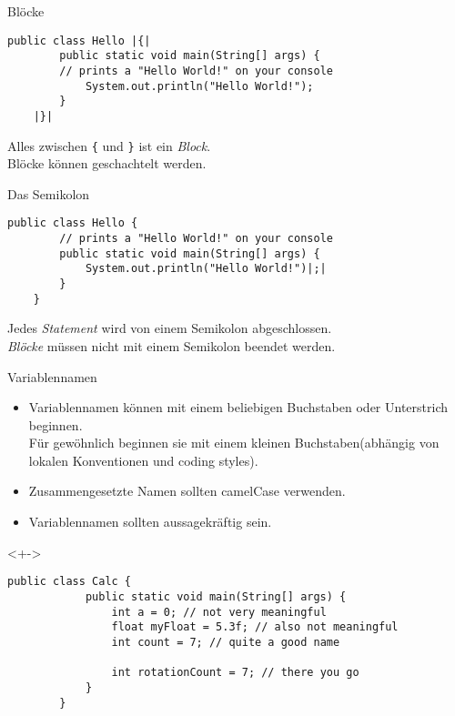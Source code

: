 \begin{frame}[fragile]{Blöcke}
    \begin{lstlisting}[gobble=4]
    public class Hello |{|
        public static void main(String[] args) {
	    // prints a "Hello World!" on your console
            System.out.println("Hello World!");
	    }
	|}|\end{lstlisting}
    Alles zwischen \texttt{\{} und \texttt{\}} ist ein \textit{Block}. \\
	Blöcke können geschachtelt werden.
\end{frame}

\begin{frame}[fragile]{Das Semikolon}
	\begin{lstlisting}[gobble=4]
	public class Hello {
	    // prints a "Hello World!" on your console
	    public static void main(String[] args) {
	        System.out.println("Hello World!")|;|
	    }
	}
	\end{lstlisting}
    Jedes \textit{Statement} wird von einem Semikolon abgeschlossen. \\
    \textit{Blöcke} müssen nicht mit einem Semikolon beendet werden.	
\end{frame}


\begin{frame}[fragile]{Variablennamen}
    \begin{itemize}[<+->]
		\item Variablennamen können mit einem beliebigen Buchstaben oder Unterstrich beginnen. \\
            Für gewöhnlich beginnen sie mit einem kleinen Buchstaben(abhängig von lokalen Konventionen und coding styles).
		\item Zusammengesetzte Namen sollten camelCase verwenden.
		\item Variablennamen sollten aussagekräftig sein.
	\end{itemize}
    \begin{onlyenv}<+->
        \begin{lstlisting}[gobble=4]
        public class Calc {
            public static void main(String[] args) {
                int a = 0; // not very meaningful
                float myFloat = 5.3f; // also not meaningful
                int count = 7; // quite a good name

                int rotationCount = 7; // there you go
            }
        }\end{lstlisting}
    \end{onlyenv}
\end{frame}

